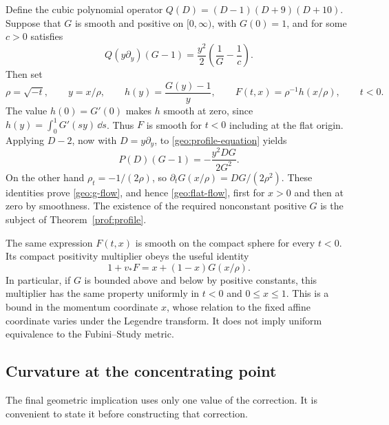 Define the cubic polynomial operator
\(Q(D)=(D-1)(D+9)(D+10)\).  Suppose that \(G\) is smooth and positive
on \([0,\infty)\), with \(G(0)=1\), and for some \(c>0\) satisfies
\begin{equation}\label{geo:profile-equation}
 Q(y\partial_y)(G-1)=\frac{y^2}{2}\left(\frac1G-\frac1c\right).
\end{equation}
Then set
\begin{equation}\label{geo:selfsimilar}
 \rho=\sqrt{-t},\qquad y=x/\rho,\qquad
 h(y)=\frac{G(y)-1}{y},\qquad
 F(t,x)=\rho^{-1}h(x/\rho),\qquad t<0.
\end{equation}
The value \(h(0)=G'(0)\) makes \(h\) smooth at zero, since
\(h(y)=\int_0^1G'(sy)\,\dd s\).  Thus \(F\) is smooth for \(t<0\)
including at the flat origin.  Applying \(D-2\), now with
\(D=y\partial_y\), to \eqref{geo:profile-equation} yields
\[
 P(D)(G-1)=-\frac{y^2DG}{2G^2}.
\]
On the other hand \(\rho_t=-1/(2\rho)\), so
\(\partial_tG(x/\rho)=DG/(2\rho^2)\).  These identities prove
\eqref{geo:g-flow}, and hence \eqref{geo:flat-flow}, first for \(x>0\)
and then at zero by smoothness.  The existence of the required
nonconstant positive \(G\) is the subject of
Theorem~\ref{prof:profile}.

The same expression \(F(t,x)\) is smooth on the compact sphere for
every \(t<0\).  Its compact positivity multiplier obeys the useful
identity
\begin{equation}\label{geo:approximate-positivity}
 1+v_*F=x+(1-x)G(x/\rho).
\end{equation}
In particular, if \(G\) is bounded above and below by positive
constants, this multiplier has the same property uniformly in
\(t<0\) and \(0\leq x\leq1\).
This is a bound in the momentum coordinate \(x\), whose relation
to the fixed affine coordinate varies under the Legendre transform.
It does not imply uniform equivalence to the Fubini--Study metric.

\subsection{Curvature at the concentrating point}

The final geometric implication uses only one value of the correction.
It is convenient to state it before constructing that correction.

